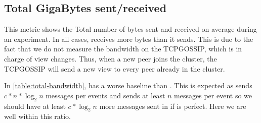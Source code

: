 \subsection{Total GigaBytes sent/received}
This metric shows the Total number of bytes sent and received on average during an experiment.
In all cases, \jgroups receives more bytes than it sends. This is due to the fact that we do not measure the bandwidth on the TCPGOSSIP, which is in charge of view changes. Thus, when a new peer joins the cluster, the TCPGOSSIP will send a new view to every peer already in the cluster.
\par
\begin{table}[hpt]
	\centering
	\caption{Total \si{\giga\byte} sent/received in a stable system}
	\label{table:total-bandwidth} 
\end{table}
In \autoref{table:total-bandwidth}, \epto has a worse baseline than \jgroups. This is expected as \epto sends $c*n*\log_2 n$ messages per events and \jgroups sends at least $n$ messages per event so we should have at least $c*\log_2 n$ more messages sent in \epto if \jgroups is perfect. Here we are well within this ratio.
